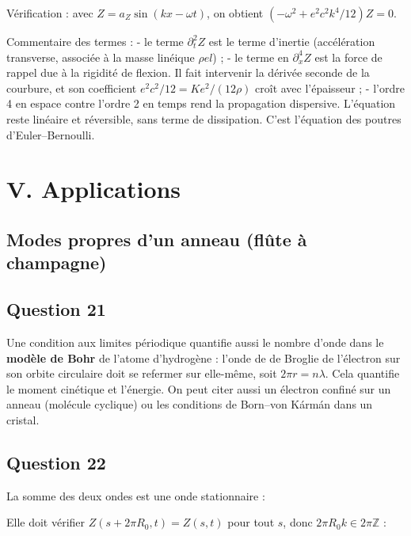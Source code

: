 \documentclass[11pt,a4paper]{article}
\newcommand{\equationajustee}[1]{%
  \sbox{\boiteequation}{$\displaystyle #1$}%
  \ifdim\wd\boiteequation>\linewidth
    \[\resizebox{\linewidth}{!}{\usebox{\boiteequation}}\]%
  \else
    \[#1\]%
  \fi}
\begin{document}
Vérification : avec \(Z=a_Z\sin(kx-\omega t)\), on obtient \((-\omega^2+e^2c^2k^4/12)Z=0\).

Commentaire des termes :
- le terme \(\partial_t^2Z\) est le terme d'inertie (accélération transverse, associée à la masse linéique \(\rho el\)) ;
- le terme en \(\partial_x^4Z\) est la force de rappel due à la rigidité de flexion. Il fait intervenir la dérivée seconde de la courbure, et son coefficient \(e^2c^2/12=Ke^2/(12\rho)\) croît avec l'épaisseur ;
- l'ordre 4 en espace contre l'ordre 2 en temps rend la propagation dispersive. L'équation reste linéaire et réversible, sans terme de dissipation. C'est l'équation des poutres d'Euler--Bernoulli.

\hypertarget{v.-applications}{%
\section{V. Applications}\label{v.-applications}}

\hypertarget{modes-propres-dun-anneau-fluxfbte-uxe0-champagne}{%
\subsection{Modes propres d'un anneau (flûte à champagne)}\label{modes-propres-dun-anneau-fluxfbte-uxe0-champagne}}

\hypertarget{question-21}{%
\subsection{Question 21}\label{question-21}}

Une condition aux limites périodique quantifie aussi le nombre d'onde dans le \textbf{modèle de Bohr} de l'atome d'hydrogène : l'onde de de Broglie de l'électron sur son orbite circulaire doit se refermer sur elle-même, soit \(2\pi r=n\lambda\). Cela quantifie le moment cinétique et l'énergie. On peut citer aussi un électron confiné sur un anneau (molécule cyclique) ou les conditions de Born--von Kármán dans un cristal.

\hypertarget{question-22}{%
\subsection{Question 22}\label{question-22}}

La somme des deux ondes est une onde stationnaire :

\equationajustee{Z(s,t)=2a_Z\sin(ks)\cos(\omega t)}

Elle doit vérifier \(Z(s+2\pi R_0,t)=Z(s,t)\) pour tout \(s\), donc \(2\pi R_0k\in2\pi\mathbb{Z}\) :
\end{document}
